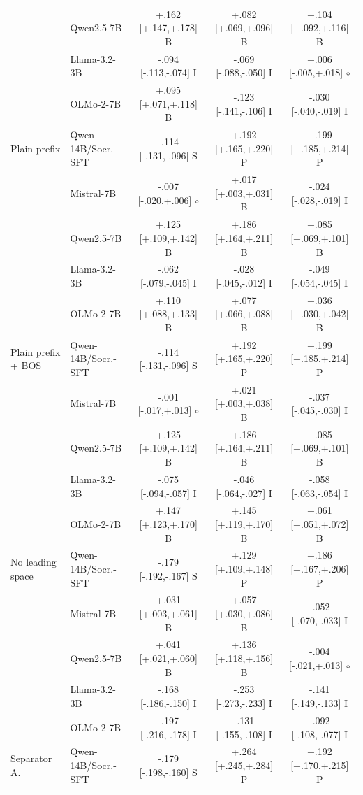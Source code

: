 \begin{table}[t]
\begin{tabular}{@{}llccc@{}}
 & Qwen2.5-7B & +.162 [+.147,+.178] B & +.082 [+.069,+.096] B & +.104 [+.092,+.116] B \\
 & Llama-3.2-3B & -.094 [-.113,-.074] I & -.069 [-.088,-.050] I & +.006 [-.005,+.018] $\circ$ \\
 & OLMo-2-7B & +.095 [+.071,+.118] B & -.123 [-.141,-.106] I & -.030 [-.040,-.019] I \\
\addlinespace[1pt]
Plain prefix & Qwen-14B/Socr.-SFT & -.114 [-.131,-.096] S & +.192 [+.165,+.220] P & +.199 [+.185,+.214] P \\
 & Mistral-7B & -.007 [-.020,+.006] $\circ$ & +.017 [+.003,+.031] B & -.024 [-.028,-.019] I \\
 & Qwen2.5-7B & +.125 [+.109,+.142] B & +.186 [+.164,+.211] B & +.085 [+.069,+.101] B \\
 & Llama-3.2-3B & -.062 [-.079,-.045] I & -.028 [-.045,-.012] I & -.049 [-.054,-.045] I \\
 & OLMo-2-7B & +.110 [+.088,+.133] B & +.077 [+.066,+.088] B & +.036 [+.030,+.042] B \\
\addlinespace[1pt]
Plain prefix + BOS & Qwen-14B/Socr.-SFT & -.114 [-.131,-.096] S & +.192 [+.165,+.220] P & +.199 [+.185,+.214] P \\
 & Mistral-7B & -.001 [-.017,+.013] $\circ$ & +.021 [+.003,+.038] B & -.037 [-.045,-.030] I \\
 & Qwen2.5-7B & +.125 [+.109,+.142] B & +.186 [+.164,+.211] B & +.085 [+.069,+.101] B \\
 & Llama-3.2-3B & -.075 [-.094,-.057] I & -.046 [-.064,-.027] I & -.058 [-.063,-.054] I \\
 & OLMo-2-7B & +.147 [+.123,+.170] B & +.145 [+.119,+.170] B & +.061 [+.051,+.072] B \\
\addlinespace[1pt]
No leading space & Qwen-14B/Socr.-SFT & -.179 [-.192,-.167] S & +.129 [+.109,+.148] P & +.186 [+.167,+.206] P \\
 & Mistral-7B & +.031 [+.003,+.061] B & +.057 [+.030,+.086] B & -.052 [-.070,-.033] I \\
 & Qwen2.5-7B & +.041 [+.021,+.060] B & +.136 [+.118,+.156] B & -.004 [-.021,+.013] $\circ$ \\
 & Llama-3.2-3B & -.168 [-.186,-.150] I & -.253 [-.273,-.233] I & -.141 [-.149,-.133] I \\
 & OLMo-2-7B & -.197 [-.216,-.178] I & -.131 [-.155,-.108] I & -.092 [-.108,-.077] I \\
\addlinespace[1pt]
Separator A. & Qwen-14B/Socr.-SFT & -.179 [-.198,-.160] S & +.264 [+.245,+.284] P & +.192 [+.170,+.215] P \\

\end{tabular}
\end{table}
